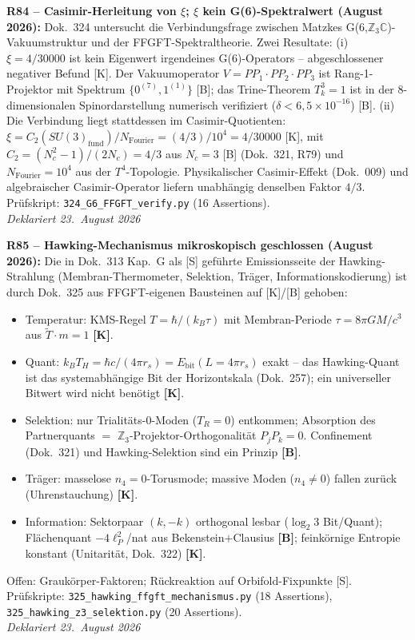 \medskip
\textbf{R84 -- Casimir-Herleitung von $\xi$; $\xi$ kein G(6)-Spektralwert (August 2026):} Dok.~324 untersucht die Verbindungsfrage zwischen Matzkes G(6,$\mathbb{Z}_3\mathbb{C}$)-Vakuumstruktur und der FFGFT-Spektraltheorie. Zwei Resultate: (i) $\xi = 4/30000$ ist kein Eigenwert irgendeines G(6)-Operators -- abgeschlossener negativer Befund [K]. Der Vakuumoperator $V = PP_1\cdot PP_2\cdot PP_3$ ist Rang-1-Projektor mit Spektrum $\{0^{(7)}, 1^{(1)}\}$ [B]; das Trine-Theorem $T_k^3 = 1$ ist in der 8-dimensionalen Spinordarstellung numerisch verifiziert ($\delta < 6{,}5\times10^{-16}$) [B]. (ii) Die Verbindung liegt stattdessen im Casimir-Quotienten: $\xi = C_2(SU(3)_{\mathrm{fund}})/N_{\mathrm{Fourier}} = (4/3)/10^4 = 4/30000$ [K], mit $C_2 = (N_c^2-1)/(2N_c) = 4/3$ aus $N_c = 3$ [B] (Dok.~321, R79) und $N_{\mathrm{Fourier}} = 10^4$ aus der $T^4$-Topologie. Physikalischer Casimir-Effekt (Dok.~009) und algebraischer Casimir-Operator liefern unabhängig denselben Faktor $4/3$. Prüfskript: \texttt{324\_G6\_FFGFT\_verify.py} (16 Assertions).\\
\emph{Deklariert 23.~August 2026}

\medskip
\textbf{R85 -- Hawking-Mechanismus mikroskopisch geschlossen (August 2026):} Die in Dok.~313 Kap.~G als [S] geführte Emissionsseite der Hawking-Strahlung (Membran-Thermometer, Selektion, Träger, Informationskodierung) ist durch Dok.~325 aus FFGFT-eigenen Bausteinen auf [K]/[B] gehoben:
\begin{itemize}
  \item Temperatur: KMS-Regel $T = \hbar/(k_B\tau)$ mit Membran-Periode $\tau = 8\pi GM/c^3$ aus $\widetilde{T}\cdot m = 1$ \textbf{[K]}.
  \item Quant: $k_B T_H = \hbar c/(4\pi r_s) = E_{\mathrm{bit}}(L = 4\pi r_s)$ exakt -- das Hawking-Quant ist das systemabhängige Bit der Horizontskala (Dok.~257); ein universeller Bitwert wird nicht benötigt \textbf{[K]}.
  \item Selektion: nur Trialitäts-0-Moden ($T_R = 0$) entkommen; Absorption des Partnerquants $=$ $\mathbb{Z}_3$-Projektor-Orthogonalität $P_jP_k = 0$. Confinement (Dok.~321) und Hawking-Selektion sind ein Prinzip \textbf{[B]}.
  \item Träger: masselose $n_4{=}0$-Torusmode; massive Moden ($n_4 \neq 0$) fallen zurück (Uhrenstauchung) \textbf{[K]}.
  \item Information: Sektorpaar $(k,-k)$ orthogonal lesbar ($\log_2 3$ Bit/Quant); Flächenquant $-4\ell_P^2$/nat aus Bekenstein$+$Clausius \textbf{[B]}; feinkörnige Entropie konstant (Unitarität, Dok.~322) \textbf{[K]}.
\end{itemize}
Offen: Graukörper-Faktoren; Rückreaktion auf Orbifold-Fixpunkte [S]. Prüfskripte: \texttt{325\_hawking\_ffgft\_mechanismus.py} (18 Assertions), \texttt{325\_hawking\_z3\_selektion.py} (20 Assertions).\\
\emph{Deklariert 23.~August 2026}

\medskip
